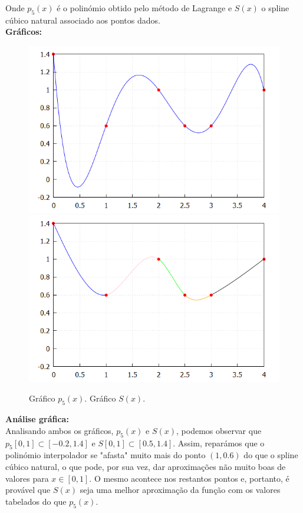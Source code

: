 \documentclass{article}
\begin{document}
Onde $p_5(x)$ é o polinómio obtido pelo método de Lagrange e $S(x)$ o spline cúbico natural associado aos pontos dados.\\[3mm]
\textbf{Gráficos:}
\begin{figure}[H]
\begin{center}
\includegraphics[scale=0.3]{./image1.png}
\includegraphics[scale=0.3]{./image2.png}
\caption*{Gráfico $p_5(x)$.\hspace{40mm} Gráfico $S(x)$.}
\end{center}
\end{figure}
\begin{flushleft}
\textbf{Análise gráfica:}\\
Analisando ambos os gráficos, $p_5(x)$ e $S(x)$, podemos observar que $p_5[0,1]\subset [-0.2,1.4]$ e $S[0,1]\subset [0.5,1.4]$. Assim, reparámos que o polinómio interpolador se "afasta" muito mais do ponto $(1,0.6)$ do que o spline cúbico natural, o que pode, por sua vez, dar aproximações não muito boas de valores para $x\in[0,1]$. O mesmo acontece nos restantos pontos e, portanto, é provável que $S(x)$ seja uma melhor aproximação da função com os valores tabelados do que $p_5(x)$.

\end{flushleft}
\end{document}
